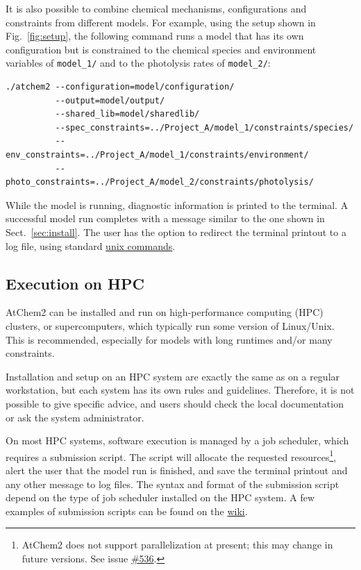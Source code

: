 It is also possible to combine chemical mechanisms, configurations and constraints from
different models. For example, using the setup shown in Fig.~\ref{fig:setup}, the following
command runs a model that has its own configuration but is constrained to the chemical species
and environment variables of \texttt{model\_1/} and to the photolysis rates of \texttt{model\_2/}:

\begin{Verbatim}[fontsize=\small]
./atchem2 --configuration=model/configuration/
          --output=model/output/
          --shared_lib=model/sharedlib/
          --spec_constraints=../Project_A/model_1/constraints/species/
          --env_constraints=../Project_A/model_1/constraints/environment/
          --photo_constraints=../Project_A/model_2/constraints/photolysis/
\end{Verbatim}

While the model is running, diagnostic information is printed to the terminal. A successful
model run completes with a message similar to the one shown in Sect.~\ref{sec:install}. The
user has the option to redirect the terminal printout to a log file, using standard
\href{https://swcarpentry.github.io/shell-novice}{unix commands}.

\subsection{Execution on HPC} \label{subsec:execution-hpc}

AtChem2 can be installed and run on high-performance computing (HPC) clusters, or
supercomputers, which typically run some version of Linux/Unix. This is recommended, especially
for models with long runtimes and/or many constraints.

Installation and setup on an HPC system are exactly the same as on a regular workstation, but
each system has its own rules and guidelines. Therefore, it is not possible to give specific
advice, and users should check the local documentation or ask the system administrator.

On most HPC systems, software execution is managed by a job scheduler, which requires a
submission script. The script will allocate the requested resources\footnote{AtChem2 does not
  support parallelization at present; this may change in future versions. See issue
  \href{https://github.com/AtChem/AtChem2/issues/536}{\#536}.}, alert the user that the model
run is finished, and save the terminal printout and any other message to log files. The syntax
and format of the submission script depend on the type of job scheduler installed on the HPC
system. A few examples of submission scripts can be found on the
\href{https://github.com/AtChem/AtChem2/wiki/Running-on-HPC}{wiki}.


